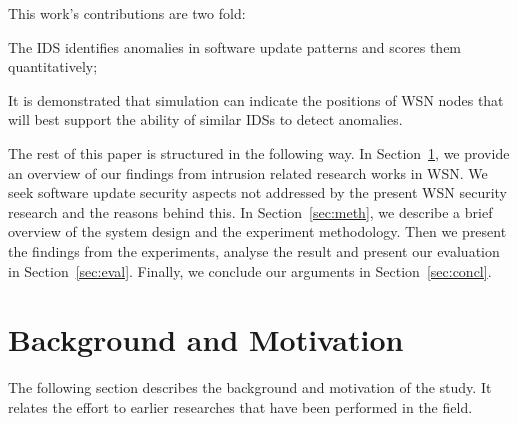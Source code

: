 \documentclass[conference]{IEEEtran}
\newcommand{\notedme}[1]{\raisebox{0pt}[0pt][0pt]{\pdfcomment[open=true,color=blue]{#1}}}
\begin{document}
This work's contributions are two fold: 
\begin{inparaenum}
\item  The IDS identifies anomalies in software update patterns and scores them quantitatively;
\item It is demonstrated that simulation can indicate the positions of WSN nodes that will best support the ability of similar IDSs to detect anomalies.
\end{inparaenum}

The rest of this paper is structured in the following way. 
In Section~\ref{sec:lit}, we provide an overview of our findings from intrusion related research works in WSN. 
We seek software update security aspects not addressed by the present WSN security research and the reasons behind this. 
In Section~\ref{sec:meth}, we describe a brief overview of the system  design and the experiment methodology. 
Then we  present the findings from the experiments, analyse the result and present our evaluation in Section~\ref{sec:eval}.  
Finally, we conclude our arguments in Section~\ref{sec:concl}.

\section{Background and Motivation}
\label{sec:lit}

The following section describes the background and motivation of the study.  It relates the effort to earlier researches that have been performed in the field.
\end{document}
